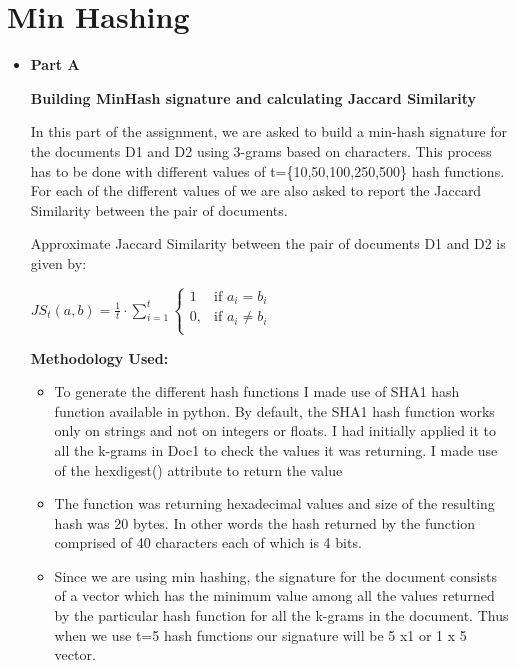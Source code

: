 \documentclass[11pt]{article}
\begin{document}
	
\section{Min Hashing}

\begin{itemize}
\item[] \textbf{Part A} 

\textbf{Building MinHash signature and calculating Jaccard Similarity}

In this part of the assignment, we are asked to build a min-hash signature for the documents D1 and D2 using 3-grams based on characters. This process has to be done with  different values of t=\{10,50,100,250,500\} hash functions. For each of the different values of we are also asked to report the Jaccard Similarity between the pair of documents.

Approximate Jaccard Similarity between the pair of documents D1 and D2 is given by:

\begin{center}
$JS_t(a,b) = \frac{1}{t} \cdot \sum _{i=1}^{t}
\begin{cases}
1 & \text{if } a_i=b_i\\
0,& \text{if 
	} a_i \neq b_i\\
\end{cases}$
\end{center}

\textbf{ Methodology Used:}
\begin{itemize}
	

\item To generate the different hash functions I made use of SHA1 hash function available in python. By default, the SHA1 hash function works only on strings and not on integers or floats. I had initially applied it to all the k-grams in Doc1 to check the values it was returning. I made use of the hexdigest() attribute to return the value

\item The function was returning hexadecimal values and size of the resulting hash was 20 bytes. In other words the hash returned by the function comprised of 40 characters each of which is 4 bits.

\item Since we are using min hashing, the signature for the document consists of a vector which has the  minimum value among all the values returned by the particular hash function for all the k-grams in the document. Thus when we use t=5 hash functions our signature will be 5 x1 or 1 x 5 vector.


\end{itemize}
\end{itemize}
\end{document}
